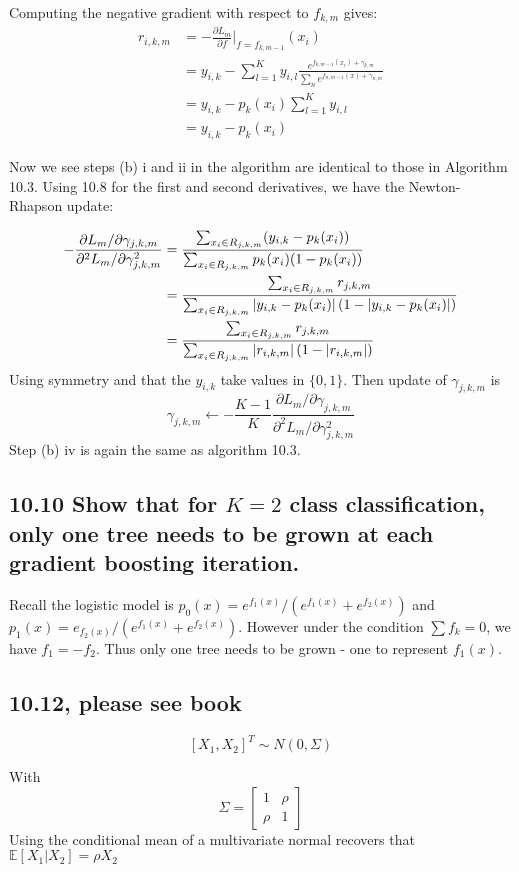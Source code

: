 Computing the negative gradient with respect to $f_{k, m}$ gives:
\begin{align*}
    r_{i,k,m} &= -\frac{\partial L_m}{\partial f}\vert_{f = f_{k,m-1}}(x_i)\\ 
    &=  y_{i,k} -   \sum_{l=1}^{K} y_{i,l} \frac{e^{f_{k,m-1}(x_i) + \gamma_{k,m}}}{\sum_n e^{f_{n,m-1}(x) + \gamma_{n,m}}} \\
     &=  y_{i,k} - p_k(x_i) \sum_{l=1}^{K} y_{i,l}\\
     &=  y_{i,k} -  p_k(x_i) 
\end{align*}

Now we see steps (b) i and ii in the algorithm are identical to those in Algorithm 10.3. Using 10.8 for the first and second derivatives, we have the Newton-Rhapson update:

\begin{align*}
    -\frac{\partial L_m / \partial \gamma_{j,k,m} }{{\partial^2 L_m / \partial \gamma_{j,k,m}^2 }} &= \frac{\sum_{x_i \in R_{j,k,m}} (y_{i,k} - p_k(x_i))}{\sum_{x_i \in R_{j,k,m}} p_k(x_i) (1 - p_k(x_i))} \\
    &= \frac{\sum_{x_i \in R_{j,k,m}} r_{j,k,m}}{\sum_{x_i \in R_{j,k,m}} \left\vert y_{i,k} - p_k(x_i)\right\vert ( 1 - \left\vert y_{i,k} - p_k(x_i)\right\vert) } \\
    &=  \frac{\sum_{x_i \in R_{j,k,m}} r_{j,k,m}}{\sum_{x_i \in R_{j,k,m}} \left\vert r_{i,k,m}\right\vert ( 1 - \left\vert r_{i,k,m}\right\vert )} 
\end{align*}
Using symmetry and that the $y_{i,k}$ take values in $\{0,1\}$.
Then update of $\gamma_{j,k,m}$ is
$$\gamma_{j,k,m} \leftarrow -\frac{K-1}{K}\frac{\partial L_m / \partial \gamma_{j,k,m} }{{\partial^2 L_m / \partial \gamma_{j,k,m}^2 }}$$
Step (b) iv is again the same as algorithm 10.3.


\subsection*{10.10 Show that for $K = 2$ class classification, only one tree needs to be grown at each gradient boosting iteration.}

Recall the logistic model is $p_0(x) = e^{f_1(x)} / ( e^{f_1(x)} + e^{f_2(x)})$ and $p_1(x) = e_{f_2(x)} / ( e^{f_1(x)} + e^{f_2(x)} )$. However under the condition $\sum f_k = 0$, we have $f_1 = -f_2$. Thus only one tree needs to be grown - one to represent $f_1(x)$.

\subsection*{10.12, please see book}

$$[X_1, X_2]^T \sim N\left(0,\Sigma
\right) $$

With $$\Sigma = \begin{bmatrix}
1 & \rho\\ 
\rho & 1
\end{bmatrix}$$
Using the conditional mean of a multivariate normal recovers that $\mathbb{E}\left[X_1 \vert X_2\right] = \rho X_2$